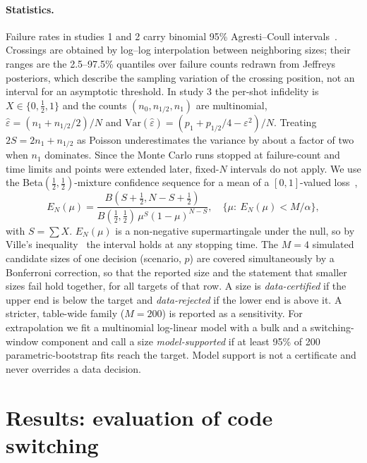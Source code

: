 \documentclass[a4paper]{article}
\begin{document}
\paragraph{Statistics.}
Failure rates in studies 1 and 2 carry binomial 95\% Agresti--Coull intervals~\cite{agresti1998}. Crossings are obtained by log--log interpolation between neighboring sizes; their ranges are the 2.5--97.5\% quantiles over failure counts redrawn from Jeffreys posteriors, which describe the sampling variation of the crossing position, not an interval for an asymptotic threshold. In study 3 the per-shot infidelity is $X\in\{0,\tfrac12,1\}$ and the counts $(n_0,n_{1/2},n_1)$ are multinomial, $\hat\varepsilon=(n_1+n_{1/2}/2)/N$ and $\mathrm{Var}(\hat\varepsilon)=(p_1+p_{1/2}/4-\varepsilon^2)/N$. Treating $2S=2n_1+n_{1/2}$ as Poisson underestimates the variance by about a factor of two when $n_1$ dominates. Since the Monte Carlo runs stopped at failure-count and time limits and points were extended later, fixed-$N$ intervals do not apply. We use the Beta$(\tfrac12,\tfrac12)$-mixture confidence sequence for a mean of a $[0,1]$-valued loss~\cite{howard2021cs},
\begin{equation}
  E_N(\mu)=\frac{B(S+\tfrac12,N-S+\tfrac12)}{B(\tfrac12,\tfrac12)\,\mu^S(1-\mu)^{N-S}},\quad \{\mu:\ E_N(\mu)<M/\alpha\},
  \label{eq:cs}
\end{equation}
with $S=\sum X$. $E_N(\mu)$ is a non-negative supermartingale under the null, so by Ville's inequality~\cite{ville1939} the interval holds at any stopping time. The $M=4$ simulated candidate sizes of one decision (scenario, $p$) are covered simultaneously by a Bonferroni correction, so that the reported size and the statement that smaller sizes fail hold together, for all targets of that row. A size is \emph{data-certified} if the upper end is below the target and \emph{data-rejected} if the lower end is above it. A stricter, table-wide family ($M=200$) is reported as a sensitivity. For extrapolation we fit a multinomial log-linear model with a bulk and a switching-window component and call a size \emph{model-supported} if at least 95\% of 200 parametric-bootstrap fits reach the target. Model support is not a certificate and never overrides a data decision.

\section{Results: evaluation of code switching}
\label{sec:results}
\end{document}

